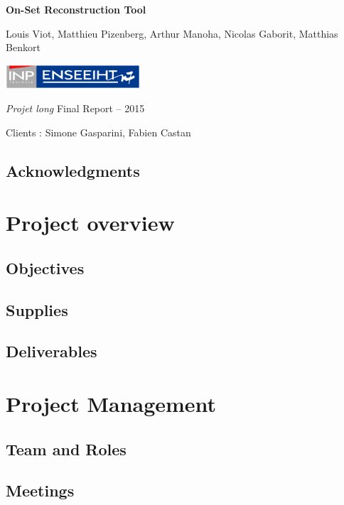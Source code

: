 \documentclass[a4paper]{report}
\title{\mytitle}
\author{\myauthor}
\date{From January, 19\up{th} to March, 13\up{th}}
\def\mytitle{On-Set Reconstruction Tool}
\def\myauthor{Louis Viot, Matthieu Pizenberg, Arthur Manoha, Nicolas
  Gaborit, Matthias Benkort}
\begin{document}
\begin{titlepage}
\centering

\null
\vfill

{\Huge\sffamily\bfseries\mytitle\par}
\vspace{1cm}
{\Large\myauthor\par}

\vfill
\vfill

\includegraphics[width=5cm]{img/inpn7.pdf}

\vfill

{\Large \emph{Projet long} Final Report -- 2015\par%
  Clients : Simone Gasparini, Fabien Castan\par}


\end{titlepage}

\newpage

\thispagestyle{empty}
\null
\vfill

\section*{Acknowledgments}


\chapter{Project overview}
\section{Objectives}
\section{Supplies}
\section{Deliverables}

\chapter{Project Management}
\section{Team and Roles}
\section{Meetings}
\end{document}
